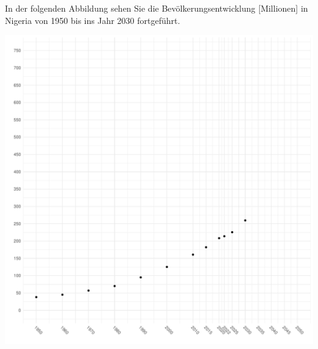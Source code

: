 \documentclass[a4paper, 9pt]{scrartcl}\usepackage[]{graphicx}\usepackage[]{xcolor}
\makeatletter
\def\maxwidth{ %
  \ifdim\Gin@nat@width>\linewidth
    \linewidth
  \else
    \Gin@nat@width
  \fi
}
\newenvironment{knitrout}{}{} %
\makeatother
\begin{document}
\newpage

In der folgenden Abbildung sehen Sie die
Bev{\"o}lkerungsentwicklung [Millionen] in Nigeria von 1950 bis ins Jahr 2030 fortgef{\"u}hrt.

\begin{knitrout}
\color{fgcolor}

{\centering \includegraphics[width=\maxwidth]{img/math-14-c-1} 

}


\end{knitrout}
\end{document}
